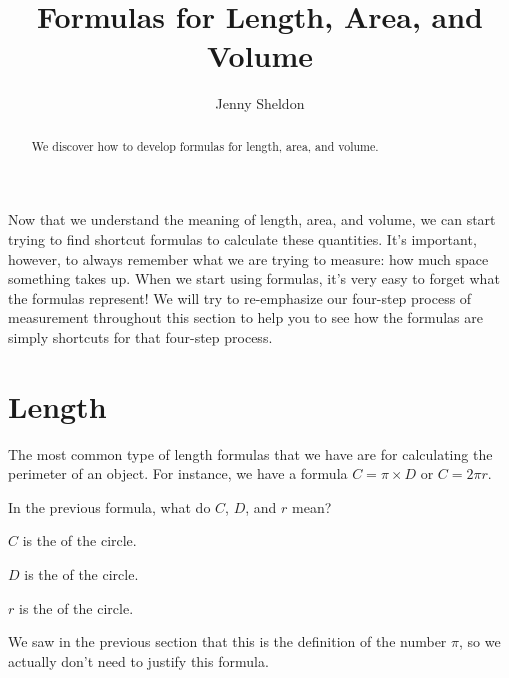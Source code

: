 \documentclass{ximera}
\title{Formulas for Length, Area, and Volume}
\author{Jenny Sheldon}
\begin{document}
\begin{abstract}
We discover how to develop formulas for length, area, and volume.
\end{abstract}
\maketitle

Now that we understand the meaning of length, area, and volume, we can start trying to find shortcut formulas to calculate these quantities. It's important, however, to always remember what we are trying to measure: how much space something takes up. When we start using formulas, it's very easy to forget what the formulas represent! We will try to re-emphasize our four-step process of measurement throughout this section to help you to see how the formulas are simply shortcuts for that four-step process.


\section{Length}
The most common type of length formulas that we have are for calculating the perimeter of an object. For instance, we have a formula $C = \pi \times D$ or $C = 2 \pi r$.
\begin{question}
In the previous formula, what do $C$, $D$, and $r$ mean?

\begin{prompt}
$C$ is the  of the circle.

$D$ is the  of the circle. 

$r$ is the  of the circle. 
\end{prompt}
\end{question}
We saw in the previous section that this is the definition of the number $\pi$, so we actually don't need to justify this formula.
\end{document}
